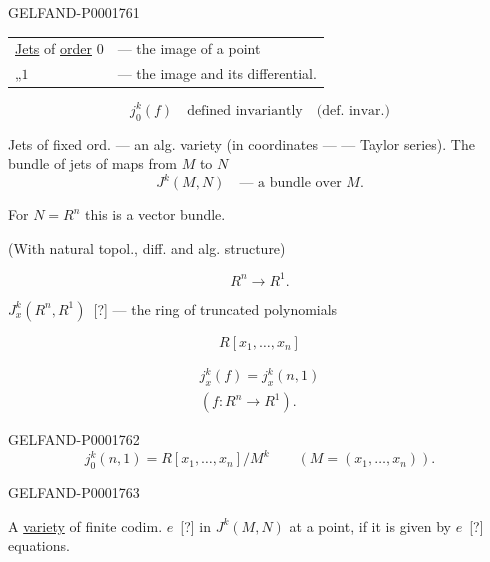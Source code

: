 \begin{GelfandAdjacentEvidence}{GELFAND-P000176}{1}
\begin{tabular}{@{}ll@{}}
\underline{Jets} of \underline{order} $0$&— the image of a point\\
\quad„\quad $1$&— the image and its differential.
\end{tabular}

\begin{equation*}j_0^k (f)\quad\text{defined invariantly}\quad\text{(def. invar.)}\end{equation*}

Jets of fixed ord. — an alg. variety (in coordinates — — Taylor series). The bundle of jets of maps from $M$ to $N$
\begin{equation*}J^k (M, N)\quad\text{— a bundle over }M.\end{equation*}

For $N=R^n$ this is a vector bundle.

(With natural topol., diff. and alg. structure)

\begin{equation*}R^n\longrightarrow R^1.\end{equation*}

$J_x^k (R^n, R^1)$\, [?] — the ring of truncated polynomials
\end{GelfandAdjacentEvidence}

\begin{equation*}R[x_1,\ldots, x_n]\end{equation*}

\begin{gather*}j_x^k (f)=j_x^k (n,1)\\(f: R^n\to R^1).\end{gather*}

\begin{GelfandAdjacentEvidence}{GELFAND-P000176}{2}
\begin{equation*}j_0^k (n,1)=R[x_1,\ldots, x_n]/M^k\qquad (M=(x_1,\ldots, x_n)).\end{equation*}
\end{GelfandAdjacentEvidence}
\begin{GelfandAdjacentEvidence}{GELFAND-P000176}{3}

A \underline{variety} of finite codim. $e$\, [?] in $J^k (M, N)$ at a point, if it is given by $e$\, [?] equations.
\end{GelfandAdjacentEvidence}

